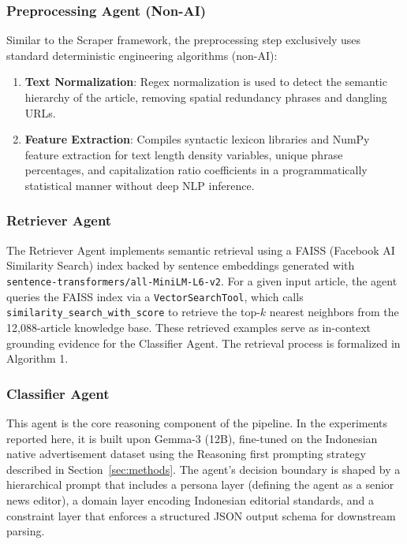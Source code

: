 \documentclass{ieeeaccess}
\begin{document}
\subsubsection{Preprocessing Agent (Non-AI)}
Similar to the Scraper framework, the preprocessing step exclusively uses standard deterministic engineering algorithms (non-AI):
\begin{enumerate}
    \item \textbf{Text Normalization}: Regex normalization is used to detect the semantic hierarchy of the article, removing spatial redundancy phrases and dangling URLs.
    \item \textbf{Feature Extraction}: Compiles syntactic lexicon libraries and NumPy feature extraction for text length density variables, unique phrase percentages, and capitalization ratio coefficients in a programmatically statistical manner without deep NLP inference.
\end{enumerate}

\subsubsection{Retriever Agent}
The Retriever Agent implements semantic retrieval using a FAISS (Facebook AI Similarity Search) index backed by sentence embeddings generated with \texttt{sentence\allowbreak-transformers/all\allowbreak-MiniLM\allowbreak-L6\allowbreak-v2}. For a given input article, the agent queries the FAISS index via a \texttt{VectorSearch\allowbreak Tool}, which calls \texttt{similarity\allowbreak\_search\allowbreak\_with\allowbreak\_score} to retrieve the top-$k$ nearest neighbors from the 12,088-article knowledge base. These retrieved examples serve as in-context grounding evidence for the Classifier Agent. The retrieval process is formalized in Algorithm 1.

\subsubsection{Classifier Agent}
This agent is the core reasoning component of the pipeline. In the experiments reported here, it is built upon Gemma-3 (12B), fine-tuned on the Indonesian native advertisement dataset using the Reasoning first prompting strategy described in Section~\ref{sec:methods}. The agent's decision boundary is shaped by a hierarchical prompt that includes a persona layer (defining the agent as a senior news editor), a domain layer encoding Indonesian editorial standards, and a constraint layer that enforces a structured JSON output schema for downstream parsing.
\end{document}
